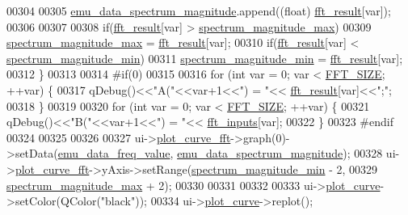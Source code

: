 \begin{DoxyCode}
00304 
00305          \hyperlink{a00008_ac3c515466f79ab8e60a58e8d15a3b991}{emu\_data\_spectrum\_magnitude}.append((\textcolor{keywordtype}{float})
      \hyperlink{a00008_a63b6150bfbba86ba943877a2f547ddd8}{fft\_result}[var]);
00306 
00307 
00308          \textcolor{keywordflow}{if}(\hyperlink{a00008_a63b6150bfbba86ba943877a2f547ddd8}{fft\_result}[var] > \hyperlink{a00008_ae0119c7dd2179cdcb3ea37adbefdc289}{spectrum\_magnitude\_max})
00309              \hyperlink{a00008_ae0119c7dd2179cdcb3ea37adbefdc289}{spectrum\_magnitude\_max} = \hyperlink{a00008_a63b6150bfbba86ba943877a2f547ddd8}{fft\_result}[var];
00310          \textcolor{keywordflow}{if}(\hyperlink{a00008_a63b6150bfbba86ba943877a2f547ddd8}{fft\_result}[var] < \hyperlink{a00008_afb692cc49c350d4bf120ca1e3dd61e93}{spectrum\_magnitude\_min})
00311              \hyperlink{a00008_afb692cc49c350d4bf120ca1e3dd61e93}{spectrum\_magnitude\_min} = \hyperlink{a00008_a63b6150bfbba86ba943877a2f547ddd8}{fft\_result}[var];
00312      \}
00313 
00314 \textcolor{preprocessor}{#if(0)}
00315 
00316      \textcolor{keywordflow}{for} (\textcolor{keywordtype}{int} var = 0; var < \hyperlink{a00094_a636ddc19af00bc87969a07c88331f105}{FFT\_SIZE}; ++var) \{
00317           qDebug()<<\textcolor{stringliteral}{"A("}<<var+1<<\textcolor{stringliteral}{") = "}<< \hyperlink{a00008_a63b6150bfbba86ba943877a2f547ddd8}{fft\_result}[var]<<\textcolor{stringliteral}{";"};
00318      \}
00319 
00320      \textcolor{keywordflow}{for} (\textcolor{keywordtype}{int} var = 0; var < \hyperlink{a00094_a636ddc19af00bc87969a07c88331f105}{FFT\_SIZE}; ++var) \{
00321           qDebug()<<\textcolor{stringliteral}{"B("}<<var+1<<\textcolor{stringliteral}{") = "}<< \hyperlink{a00008_a8782fc20094d65d56c04869b9692902e}{fft\_inputs}[var];
00322      \}
00323 \textcolor{preprocessor}{#endif}
00324 
00325 
00326 
00327      ui->\hyperlink{a00079_a2bdf46ca3b702151408e6f6bd96b3228}{plot\_curve\_fft}->graph(0)->setData(\hyperlink{a00008_a62129d59e218ab857cd50cb202205129}{emu\_data\_freq\_value},
      \hyperlink{a00008_ac3c515466f79ab8e60a58e8d15a3b991}{emu\_data\_spectrum\_magnitude});
00328      ui->\hyperlink{a00079_a2bdf46ca3b702151408e6f6bd96b3228}{plot\_curve\_fft}->yAxis->setRange(\hyperlink{a00008_afb692cc49c350d4bf120ca1e3dd61e93}{spectrum\_magnitude\_min} - 2,
00329                                          \hyperlink{a00008_ae0119c7dd2179cdcb3ea37adbefdc289}{spectrum\_magnitude\_max} + 2);
00330 
00331 
00332 
00333      ui->\hyperlink{a00079_a1d46308dee8db7e3c99af65f13055479}{plot\_curve}->setColor(QColor(\textcolor{stringliteral}{"black"}));
00334      ui->\hyperlink{a00079_a1d46308dee8db7e3c99af65f13055479}{plot\_curve}->replot();

\end{DoxyCode}

